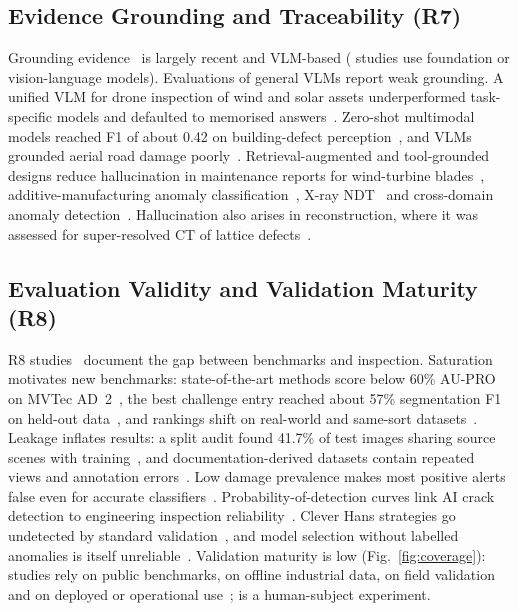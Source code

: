 \documentclass[journal]{IEEEtran}
\begin{document}
\subsection{Evidence Grounding and Traceability (R7)}
Grounding evidence~\citeSeven{} is largely recent and VLM-based (\nVLM{} studies use foundation or vision-language models). Evaluations of general VLMs report weak grounding. A unified VLM for drone inspection of wind and solar assets underperformed task-specific models and defaulted to memorised answers~\cite{wallace2025inspectvlm}. Zero-shot multimodal models reached F1 of about 0.42 on building-defect perception~\cite{zhong2026can}, and VLMs grounded aerial road damage poorly~\cite{liu2026wildroadbench}. Retrieval-augmented and tool-grounded designs reduce hallucination in maintenance reports for wind-turbine blades~\cite{malikussaid2026hybrid}, additive-manufacturing anomaly classification~\cite{naghavikhanghah2025multimodal}, X-ray NDT~\cite{liu2026insightx} and cross-domain anomaly detection~\cite{jiang2026anomalyclaw,deng2026global,chen2026zsg}. Hallucination also arises in reconstruction, where it was assessed for super-resolved CT of lattice defects~\cite{klos2025super}.

\subsection{Evaluation Validity and Validation Maturity (R8)}
R8 studies~\citeEight{} document the gap between benchmarks and inspection. Saturation motivates new benchmarks: state-of-the-art methods score below 60\% AU-PRO on MVTec AD~2~\cite{hecklerkram2026the}, the best challenge entry reached about 57\% segmentation F1 on held-out data~\cite{hecklerkram2026detecting}, and rankings shift on real-world and same-sort datasets~\cite{wang2024real,wang2025hss,baitieva2025beyond,xie2024iad,hecklerkram2025from}. Leakage inflates results: a split audit found 41.7\% of test images sharing source scenes with training~\cite{wu2026hdsi}, and documentation-derived datasets contain repeated views and annotation errors~\cite{bartczak2026dataset}. Low damage prevalence makes most positive alerts false even for accurate classifiers~\cite{plevris2025assessing}. Probability-of-detection curves link AI crack detection to engineering inspection reliability~\cite{kompanets2026evaluation}. Clever Hans strategies go undetected by standard validation~\cite{kauffmann2025explainable,kauffmann2020the,posadamoreno2023scale}, and model selection without labelled anomalies is itself unreliable~\cite{fung2025model,yoo2023dsv}. Validation maturity is low (Fig.~\ref{fig:coverage}): \nBench{} studies rely on public benchmarks, \nIndOffline{} on offline industrial data, \nField{} on field validation~\citeField{} and \nDeployed{} on deployed or operational use~\citeDeployed; \nHumanExp{} is a human-subject experiment.
\end{document}
